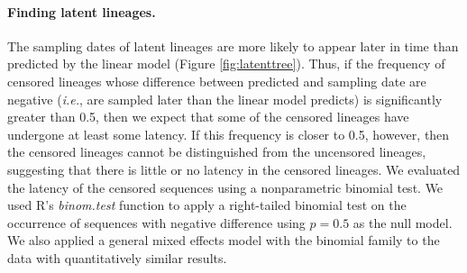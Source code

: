 \documentclass[12pt]{article}
\begin{document}
\paragraph {Finding latent lineages.} \label{subsec:experiments}

%
%
%


The sampling dates of latent lineages are more likely to appear later in time than predicted by the linear model (Figure \ref{fig:latenttree}).
Thus, if the frequency of censored lineages whose difference between predicted and sampling date are negative (\textit{i.e.}, are sampled later than the linear model predicts) is significantly greater than 0.5, then we expect that some of the censored lineages have undergone at least some latency.
If this frequency is closer to 0.5, however, then the censored lineages cannot be distinguished from the uncensored lineages, suggesting that there is little or no latency in the censored lineages.
We evaluated the latency of the censored sequences using a nonparametric binomial test.
We used R's {\it binom.test} function to apply a right-tailed binomial test on the occurrence of sequences with negative difference using $p=0.5$ as the null model.
We also applied a general mixed effects model with the binomial family to the data with quantitatively similar results.
\end{document}
